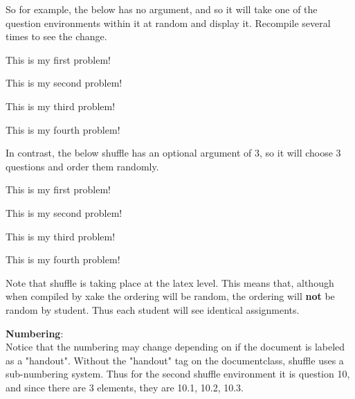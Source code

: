 \documentclass{ximera}
\begin{document}
	So for example, the below has no argument, and so it will take one of the question environments within it at random and display it. Recompile several times to see the change.
	
	\begin{shuffle}
	\begin{problem}
	This is my first problem!
	\end{problem}
	
	\begin{exercise}
	This is my second problem!
	\end{exercise}
	
	\begin{exploration}
	This is my third problem!
	\end{exploration}
	
	\begin{question}
	This is my fourth problem!
	\end{question}
	\end{shuffle}
	
	In contrast, the below shuffle has an optional argument of 3, so it will choose 3 questions and order them randomly.
	
	\begin{shuffle}[3]
	\begin{problem}
	This is my first problem!
	\end{problem}
	
	\begin{exercise}
	This is my second problem!
	\end{exercise}
	
	\begin{exploration}
	This is my third problem!
	\end{exploration}
	
	\begin{question}
	This is my fourth problem!
	\end{question}
	\end{shuffle}
	
	Note that shuffle is taking place at the latex level. This means that, although when compiled by xake the ordering will be random, the ordering will \textbf{not} be random by student. Thus each student will see identical assignments.
	
	\textbf{Numbering}: \\
	Notice that the numbering may change depending on if the document is labeled as a "handout". Without the "handout" tag on the documentclass, shuffle uses a sub-numbering system. Thus for the second shuffle environment it is question 10, and since there are 3 elements, they are 10.1, 10.2, 10.3.
	
\end{document}
